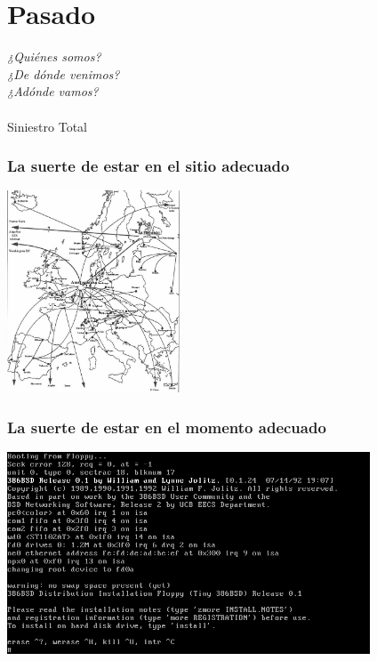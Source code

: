 

\section{Pasado}

\begin{flushright}
{\em
  ¿Quiénes somos? \\
  ¿De dónde venimos? \\
  ¿Adónde vamos? \\
}
~ \\
Siniestro Total \\
\end{flushright}


\begin{frame}[fragile]
  \frametitle{La suerte de estar en el sitio adecuado}

  \begin{center}
  \includegraphics[height=6cm]{figs/eunet}
  \end{center}  
  
\end{frame}

\begin{frame}[fragile]
  \frametitle{La suerte de estar en el momento adecuado}

  \begin{center}
  \includegraphics[height=6cm]{figs/386BSD-installer}
  \end{center}  
  
\end{frame}

